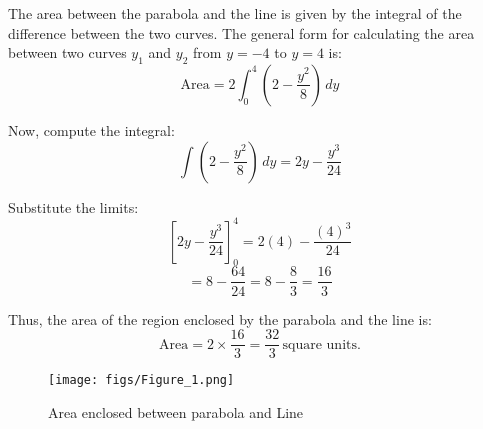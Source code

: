 \documentclass[journal]{IEEEtran}
\begin{document}
The area between the parabola and the line is given by the integral of the difference between the two curves. The general form for calculating the area between two curves $y_1$ and $y_2$ from $y = -4$ to $y = 4$ is:
\begin{equation}
\text{Area} = 2 \int_{0}^{4} \left( 2 - \frac{y^2}{8} \right) \, dy
\end{equation}

Now, compute the integral:
\begin{equation}
\int \left( 2 - \frac{y^2}{8} \right) \, dy = 2y - \frac{y^3}{24}
\end{equation}

Substitute the limits:
\begin{equation}
\left[ 2y - \frac{y^3}{24} \right]_{0}^{4} = 2(4) - \frac{(4)^3}{24}
\end{equation}
\begin{equation}
= 8 - \frac{64}{24} = 8 - \frac{8}{3} = \frac{16}{3}
\end{equation}

Thus, the area of the region enclosed by the parabola and the line is:
\begin{equation}
\text{Area} = 2 \times \frac{16}{3} = \frac{32}{3} \, \text{square units}.
\end{equation}
\begin{figure}[h!]
	\centering
	\texttt{[image: figs/Figure\_1.png]}
	\caption{Area enclosed between parabola and Line}
	\label{stemplot}
\end{figure}	
\end{document}
